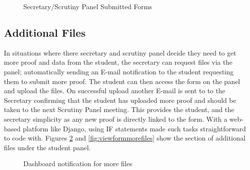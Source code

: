 \documentclass[../main.tex]{subfiles}
\begin{document}
\begin{figure}[H]
        \caption{\label{fig:ecfsectable} Secretary/Scrutiny Panel Submitted Forms}
      \end{figure}

\subsection*{Additional Files}
In situations where there secretary and scrutiny panel decide they need to get more proof and data from the student, the secretary can request files via the panel; automatically sending an E-mail notification to the student requesting them to submit more proof. The student can then access the form on the panel and upload the files. On successful upload another E-mail is sent to to the Secretary confirming that the student has uploaded more proof and should be taken to the next Scrutiny Panel meeting. This provides the student, and the secretary simplicity as any new proof is directly linked to the form. With a web-based platform like Django, using IF statements made such tasks straightforward to code with. Figures \ref{fig:dashboardmorefiles} and \ref{fig:viewformmorefiles} show the section of additional files under the student panel. 

\begin{figure}[H]
        \caption{\label{fig:dashboardmorefiles} Dashboard notification for more files}
      \end{figure}
      
\end{document}
